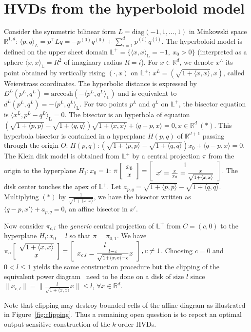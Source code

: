 \documentclass[12pt]{article}
\def\diag{\mathrm{diag}}
\def\arccosh{\mathrm{arccosh}}
\def\bbR{\mathbb{R}}
\def\bbL{\mathbb{L}}
\def\innerL#1#2{{\langle #1,#2\rangle}_L}
\def\inner#1#2{{\langle #1,#2\rangle}}
\def\innerL#1#2{{\langle #1,#2\rangle}_\mathrm{L}}
\def\myvec#1#2{ \left[\begin{array}{c}#1\cr #2\end{array}\right]}
\begin{document}
\section{HVDs from the hyperboloid model}
Consider the symmetric bilinear form $L=\diag(-1,1, ...,1)$ in Minkowski space $\bbR^{1,d}$: $\inner{p}{q}_L=p^\top L q=-p^{(0)}q^{(0)}+\sum_{i=1}^d p^{(i)}q^{(i)}$. The hyperboloid model is defined on the upper sheet domain $\bbL^+=\{ \innerL{x}{x}=-1,\ x_0>0 \}$ (interpreted as a sphere $\innerL{x}{x}=R^2$ of imaginary radius $R=i$).
For $x\in\bbR^d$, we denote $x^L$ its point obtained by vertically rising $(\cdot,x)$ on $\bbL^+$: $x^L=(\sqrt{1+\inner{x}{x}},x)$, called Weierstrass coordinates. 
The hyperbolic distance is expressed by $D^L(p^L,q^L)=\arccosh (-\innerL{p^L}{q^L})$ and is equivalent to $d^L(p^L,q^L)=-\innerL{p^L}{q^L}$.
For two points $p^L$ and $q^L$ on $\bbL^+$, the bisector equation is $\innerL{x^L}{p^L-q^L}=0$.
The bisector is an hyperbola of equation $\left(\sqrt{1+\inner{p}{p}}-\sqrt{1+\inner{q}{q}}\right) \sqrt{1+\inner{x}{x}} + \inner{q-p}{x} = 0, x\in\bbR^d \ (*)$.
This hyperbola bisector is contained in a hyperplane $H(p,q)$ of $\bbR^{d+1}$ passing through the origin $O$:
$H(p,q) :  (\sqrt{1+\inner{p}{p}}-\sqrt{1+\inner{q}{q}}) x_0 + \inner{q-p}{x} = 0$.
The Klein disk model is obtained from $\bbL^+$ by a central projection $\pi$ from the origin to the hyperplane $H_1: x_0=1$: $\pi \myvec{x_0}{x}=\myvec{1}{x'=\frac{x}{x_0}=\frac{x}{\sqrt{1+\inner{x}{x}}}}$. The disk center touches the apex of $\bbL^+$.
Let $a_{p,q}=\sqrt{1+\inner{p}{p}}-\sqrt{1+\inner{q}{q}}$.
Multiplying $(*)$ by $\frac{1}{\sqrt{1+\inner{x}{x}}}$, we have the bisector written as
$\inner{q-p}{x'}+a_{p,q}=0$, an affine bisector in $x'$.

Now consider $\pi_{c,l}$ the {\em generic} central projection of $\bbL^+$ from $C=(c,0)$ to the hyperplane $H_l:x_0=l$ so that $\pi=\pi_{0,1}$.
We have
$\pi_c \myvec{\sqrt{1+\inner{x}{x}}}{x}  = \myvec{l}{x_{c,l}=\frac{l-c}{\sqrt{1+\inner{x}{x}}-c} x}, c\not = 1$.
Choosing $c=0$ and $0<l\leq 1$ yields the same construction procedure but the clipping of the equivalent power diagram~\cite{HVDeasy-2010} need to be done on a disk of size $l$ since
$\|x_{c,l}\|= \| \frac{l}{\sqrt{1+\inner{x}{x}}}x\| \leq l$, $\forall x\in\bbR^d$.

Note that  clipping may destroy bounded cells of the affine diagram as illustrated in Figure~\ref{fig:clipping}.
Thus a remaining open question is to report an optimal output-sensitive construction of the $k$-order HVDs.
\end{document}
